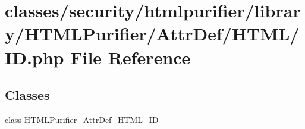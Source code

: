 \hypertarget{AttrDef_2HTML_2ID_8php}{\section{classes/security/htmlpurifier/library/\+H\+T\+M\+L\+Purifier/\+Attr\+Def/\+H\+T\+M\+L/\+I\+D.php File Reference}
\label{AttrDef_2HTML_2ID_8php}
}
\subsection*{Classes}
\begin{DoxyCompactItemize}
\item 
class \hyperlink{classHTMLPurifier__AttrDef__HTML__ID}{H\+T\+M\+L\+Purifier\+\_\+\+Attr\+Def\+\_\+\+H\+T\+M\+L\+\_\+\+I\+D}
\end{DoxyCompactItemize}
